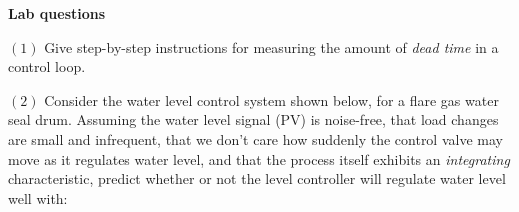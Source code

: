 \vfil \eject

\noindent
{\bf Lab questions}

\vskip 20pt

\item{$(1)$} Give step-by-step instructions for measuring the amount of {\it dead time} in a control loop.

\vskip 20pt

\item{$(2)$} Consider the water level control system shown below, for a flare gas water seal drum.  Assuming the water level signal (PV) is noise-free, that load changes are small and infrequent, that we don't care how suddenly the control valve may move as it regulates water level, and that the process itself exhibits an {\it integrating} characteristic, predict whether or not the level controller will regulate water level well with:
